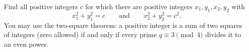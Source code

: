Find all positive integers $c$ for which there are positive integers $x_1,y_1,x_2,y_2$ with
\[x_1^2+y_1^2=c\qquad\text{and}\qquad x_2^2+y_2^2=c^2.\]
You may use the two-square theorem: a positive integer is a sum of two squares of integers (zero allowed) if and only if every prime $q\equiv3\pmod4$ divides it to an even power.
